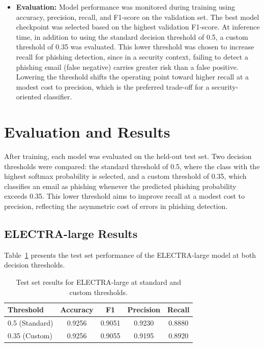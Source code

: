 \begin{itemize}
	\item \textbf{Evaluation:} Model performance was monitored during training using accuracy, precision, recall, and F1-score on the validation set. The best model checkpoint was selected based on the highest validation F1-score. At inference time, in addition to using the standard decision threshold of 0.5, a custom threshold of 0.35 was evaluated. This lower threshold was chosen to increase recall for phishing detection, since in a security context, failing to detect a phishing email (false negative) carries greater risk than a false positive. Lowering the threshold shifts the operating point toward higher recall at a modest cost to precision, which is the preferred trade-off for a security-oriented classifier.
\end{itemize}

\section{Evaluation and Results}

After training, each model was evaluated on the held-out test set. Two decision thresholds were compared: the standard threshold of 0.5, where the class with the highest softmax probability is selected, and a custom threshold of 0.35, which classifies an email as phishing whenever the predicted phishing probability exceeds 0.35. This lower threshold aims to improve recall at a modest cost to precision, reflecting the asymmetric cost of errors in phishing detection.

\subsection{ELECTRA-large Results}

Table~\ref{tab:electra_results} presents the test set performance of the \acs{ELECTRA}-large model at both decision thresholds.

\begin{table}[htbp]
\centering
\caption{Test set results for \acs{ELECTRA}-large at standard and custom thresholds.}
\label{tab:electra_results}
\begin{tabular}{lcccc}
\hline
\textbf{Threshold} & \textbf{Accuracy} & \textbf{F1} & \textbf{Precision} & \textbf{Recall} \\
\hline
0.5 (Standard) & 0.9256 & 0.9051 & 0.9230 & 0.8880 \\
0.35 (Custom)  & 0.9256 & 0.9055 & 0.9195 & 0.8920 \\
\hline
\end{tabular}
\end{table}

